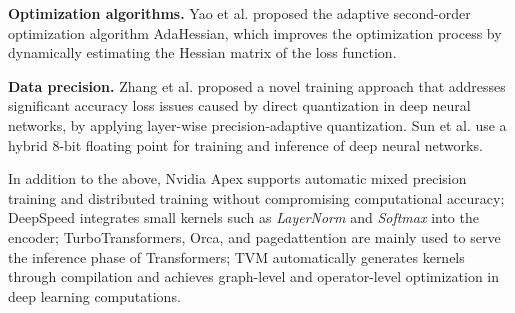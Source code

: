 \noindent\textbf{Optimization algorithms.} Yao et al.\cite{yao2021adahessian} proposed the adaptive second-order optimization algorithm AdaHessian, which improves the optimization process by dynamically estimating the Hessian matrix of the loss function.

\noindent\textbf{Data precision.} Zhang et al.\cite{zhang2020fixed} proposed a novel training approach that addresses significant accuracy loss issues caused by direct quantization in deep neural networks, by applying layer-wise precision-adaptive quantization. 
Sun et al.\cite{sun2019hybrid} use a hybrid 8-bit floating point for training and inference of deep neural networks.

In addition to the above, Nvidia Apex\cite{nvidia2020apex} supports automatic mixed precision training and distributed training without compromising computational accuracy;
DeepSpeed\cite{rasley2020deepspeed} integrates small kernels such as \textit{LayerNorm} and \textit{Softmax} into the encoder; 
TurboTransformers\cite{fang2021turbotransformers}, Orca\cite{yu2022orca}, and pagedattention\cite{kwon2023efficient} are mainly used to serve the inference phase of Transformers;
TVM\cite{chen2018tvm} automatically generates kernels through compilation and achieves graph-level and operator-level optimization in deep learning computations.